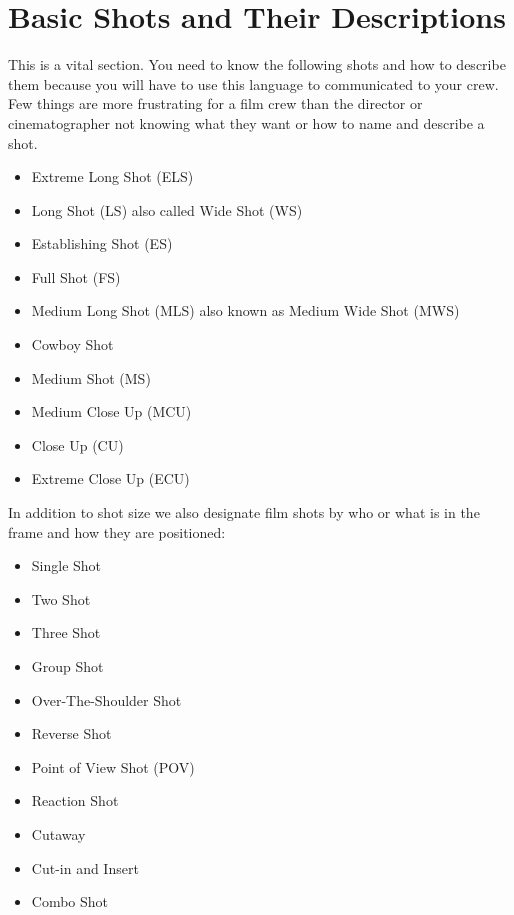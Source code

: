 \documentclass[
]{book}
\providecommand{\tightlist}{%
  \setlength{\itemsep}{0pt}\setlength{\parskip}{0pt}}
\begin{document}
\hypertarget{basic-shots-and-their-descriptions}{%
\section{Basic Shots and Their Descriptions}\label{basic-shots-and-their-descriptions}}

This is a vital section. You need to know the following shots and how to describe them because you will have to use this language to communicated to your crew. Few things are more frustrating for a film crew than the director or cinematographer not knowing what they want or how to name and describe a shot.

\begin{itemize}
\tightlist
\item
  Extreme Long Shot (ELS)\\
\item
  Long Shot (LS) also called Wide Shot (WS)\\
\item
  Establishing Shot (ES)\\
\item
  Full Shot (FS)\\
\item
  Medium Long Shot (MLS) also known as Medium Wide Shot (MWS)\\
\item
  Cowboy Shot\\
\item
  Medium Shot (MS)\\
\item
  Medium Close Up (MCU)\\
\item
  Close Up (CU)\\
\item
  Extreme Close Up (ECU)
\end{itemize}

In addition to shot size we also designate film shots by who or what is in the frame and how they are positioned:

\begin{itemize}
\tightlist
\item
  Single Shot\\
\item
  Two Shot\\
\item
  Three Shot\\
\item
  Group Shot\\
\item
  Over-The-Shoulder Shot\\
\item
  Reverse Shot\\
\item
  Point of View Shot (POV)\\
\item
  Reaction Shot\\
\item
  Cutaway\\
\item
  Cut-in and Insert\\
\item
  Combo Shot
\end{itemize}
\end{document}

